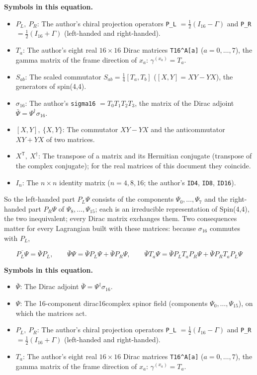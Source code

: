 \documentclass[
  10pt,
]{article}
\providecommand{\tightlist}{%
  \setlength{\itemsep}{0pt}\setlength{\parskip}{0pt}}
\begin{document}
\textbf{Symbols in this equation.}

\begin{itemize}
\tightlist
\item
  \(P_L,\ P_R\): The author's chiral projection operators \texttt{P\_L}
  \(= \tfrac12(I_{16} - \Gamma)\) and \texttt{P\_R}
  \(= \tfrac12(I_{16} + \Gamma)\) (left-handed and right-handed).
\item
  \(T_a\): The author's eight real \(16 \times 16\) Dirac matrices
  \texttt{T16\^{}A{[}a{]}} (\(a = 0, \dots, 7\)), the gamma matrix of
  the frame direction of \(x_a\): \(\gamma^{(x_a)} = T_a\).
\item
  \(S_{ab}\): The scaled commutator \(S_{ab} = \tfrac14[T_a, T_b]\)
  (\([X, Y] = XY - YX\)), the generators of spin(4,4).
\item
  \(\sigma_{16}\): The author's \texttt{sigma16} \(= T_0 T_1 T_2 T_3\),
  the matrix of the Dirac adjoint
  \(\bar\Psi = \Psi^\dagger\sigma_{16}\).
\item
  \([X, Y],\ \{X, Y\}\): The commutator \(XY - YX\) and the
  anticommutator \(XY + YX\) of two matrices.
\item
  \(X^{\mathsf T},\ X^\dagger\): The transpose of a matrix and its
  Hermitian conjugate (transpose of the complex conjugate); for the real
  matrices of this document they coincide.
\item
  \(I_n\): The \(n \times n\) identity matrix (\(n = 4, 8, 16\); the
  author's \texttt{ID4}, \texttt{ID8}, \texttt{ID16}).
\end{itemize}

So the left-handed part \(P_L\Psi\) consists of the components
\(\Psi_0, \dots, \Psi_7\) and the right-handed part \(P_R\Psi\) of
\(\Psi_8, \dots, \Psi_{15}\); each is an irreducible representation of
Spin(4,4), the two inequivalent; every Dirac matrix exchanges them. Two
consequences matter for every Lagrangian built with these matrices:
because \(\sigma_{16}\) commutes with \(P_L\),

\[
\overline{P_L\Psi} = \bar\Psi P_L,\qquad \bar\Psi\Psi = \bar\Psi P_L\Psi + \bar\Psi P_R\Psi,\qquad \bar\Psi T_a\Psi = \bar\Psi P_LT_aP_R\Psi + \bar\Psi P_RT_aP_L\Psi
\]

\textbf{Symbols in this equation.}

\begin{itemize}
\tightlist
\item
  \(\bar\Psi\): The Dirac adjoint
  \(\bar\Psi = \Psi^\dagger\sigma_{16}\).
\item
  \(\Psi\): The 16-component dirac16complex spinor field (components
  \(\Psi_0, \dots, \Psi_{15}\)), on which the matrices act.
\item
  \(P_L,\ P_R\): The author's chiral projection operators \texttt{P\_L}
  \(= \tfrac12(I_{16} - \Gamma)\) and \texttt{P\_R}
  \(= \tfrac12(I_{16} + \Gamma)\) (left-handed and right-handed).
\item
  \(T_a\): The author's eight real \(16 \times 16\) Dirac matrices
  \texttt{T16\^{}A{[}a{]}} (\(a = 0, \dots, 7\)), the gamma matrix of
  the frame direction of \(x_a\): \(\gamma^{(x_a)} = T_a\).
\end{itemize}
\end{document}
